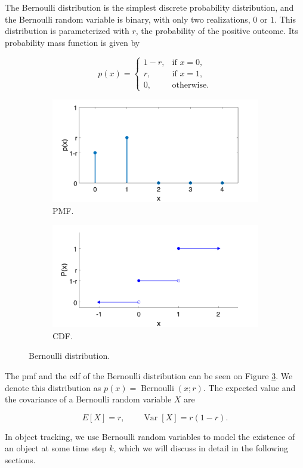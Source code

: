The Bernoulli distribution is the simplest discrete probability
distribution, and the Bernoulli random variable is binary, with only
two realizations, $0$ or $1$. This distribution is parameterized with 
$r$, the probability of the positive outcome. Its probability mass 
function is given by

$$
p(x) = \begin{cases}
 1 - r, & \text{if } x = 0, \\
     r, & \text{if } x = 1, \\
     0, & \text{otherwise}.
\end{cases}
$$

\begin{figure}
\centering
\begin{subfigure}{.5\textwidth}
  \centering
  \includegraphics[width=.9\linewidth]{figures/bern.pmf.png}
  \caption{PMF.}
  \label{fig:bern:pmf}
\end{subfigure}\hfill
\begin{subfigure}{.5\textwidth}
  \centering
  \includegraphics[width=.9\linewidth]{figures/bern.cdf.png}
  \caption{CDF.}
  \label{fig:bern:cdf}
\end{subfigure}
\caption{Bernoulli distribution.}
\label{fig:bern}
\end{figure}

The pmf and the cdf of the Bernoulli distribution can be seen on Figure \ref{fig:bern}.
We denote this distribution as $p(x) = \operatorname{Bernoulli}(x;r)$.
The expected value and the covariance of a Bernoulli random variable $X$ are

$$
E[X] = r, \qquad \operatorname{Var}[X] = r(1-r).
$$

In object tracking, we use Bernoulli random variables to model the existence of
an object at some time step $k$, which we will discuss in detail in the following
sections.
